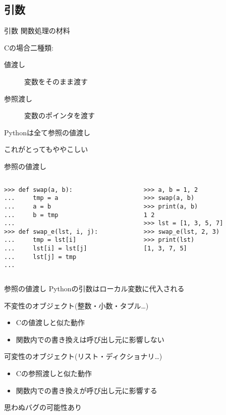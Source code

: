 \documentclass[12pt, xetex, xcolor=pdftex, dvipsnames]{beamer}
\begin{document}
\subsection{引数}
\begin{frame}{引数}
    関数処理の材料

    Cの場合二種類:
    \begin{description}
        \item[値渡し] 変数をそのまま渡す
        \item[参照渡し] 変数のポインタを渡す
    \end{description}

    Pythonは全て\alert{参照の値渡し}

    \pause
    これがとってもややこしい
\end{frame}
\begin{frame}[fragile]{参照の値渡し}
    \begin{columns}[t]
        \begin{column}{0.51\hsize}
\begin{lstlisting}
>>> def swap(a, b):
...     tmp = a
...     a = b
...     b = tmp
...
>>> def swap_e(lst, i, j):
...     tmp = lst[i]
...     lst[i] = lst[j]
...     lst[j] = tmp
...
\end{lstlisting}
        \end{column}
        \begin{column}{0.47\hsize}
\begin{lstlisting}
>>> a, b = 1, 2
>>> swap(a, b)
>>> print(a, b)
1 2
>>> lst = [1, 3, 5, 7]
>>> swap_e(lst, 2, 3)
>>> print(lst)
[1, 3, 7, 5]
\end{lstlisting}
        \end{column}
    \end{columns}
\end{frame}
\begin{frame}{参照の値渡し}
    Pythonの引数はローカル変数に\alert{代入}される

    \begin{block}{不変性のオブジェクト(整数・小数・タプル\dots)}
        \begin{itemize}
            \item Cの値渡しと似た動作
            \item 関数内での書き換えは呼び出し元に影響しない
        \end{itemize}
     \end{block}
    \begin{block}{可変性のオブジェクト(リスト・ディクショナリ\dots)}
        \begin{itemize}
            \item Cの参照渡しと似た動作
            \item 関数内での書き換えが呼び出し元に影響する
        \end{itemize}
    \end{block}

    \pause
    \alert{思わぬバグの可能性あり}
\end{frame}
\end{document}
